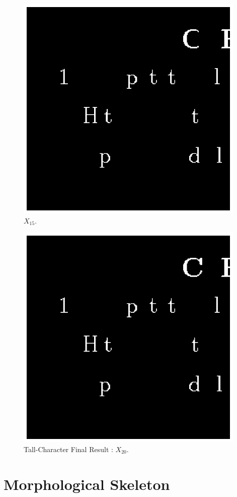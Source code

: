 \documentclass[paper=a4, fontsize=11pt]{scrartcl}
\begin{document}
\begin{figure}
	\centering
	\includegraphics[width=11cm]{Q1_X15.eps}
	\caption{$X_{15}$.}
	\label{fig:5}
\end{figure}

\begin{figure}
	\centering
	\includegraphics[width=11cm]{Q1_X20.eps}
	\caption{Tall-Character Final Result : $X_{20}$.}
	\label{fig:6}
\end{figure}

\section{Morphological Skeleton}
\end{document}
